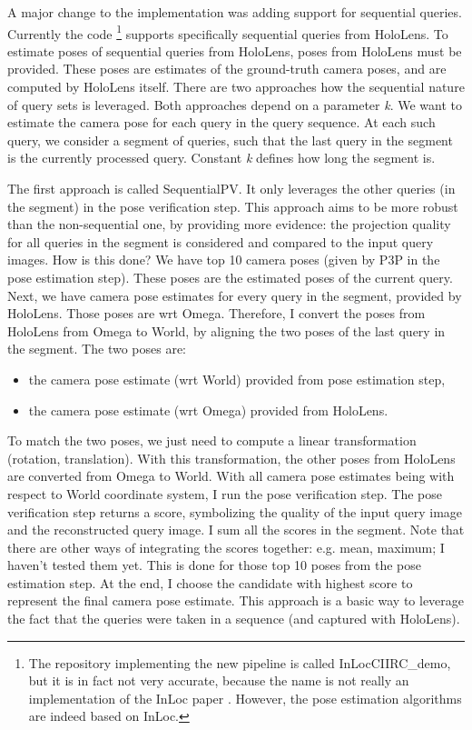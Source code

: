 \documentclass[twoside]{ctuthesis}
\theoremstyle{plain}
\theoremstyle{definition}
\theoremstyle{note}
\newcommand{\topPE}{10} %
\begin{document}
A major change to the implementation was adding support for sequential queries. Currently the code \footnote{The repository implementing the new pipeline is called InLocCIIRC\_demo, but it is in fact not very accurate, because the name is not really an implementation of the InLoc paper \cite{taira2018inloc}. However, the pose estimation algorithms are indeed based on InLoc.} supports specifically sequential queries from HoloLens. To estimate poses of sequential queries from HoloLens, poses from HoloLens must be provided. These poses are estimates of the ground-truth camera poses, and are computed by HoloLens itself. There are two approaches how the sequential nature of query sets is leveraged. Both approaches depend on a parameter \emph{k}. We want to estimate the camera pose for each query in the query sequence. At each such query, we consider a segment of queries, such that the last query in the segment is the currently processed query. Constant \emph{k} defines how long the segment is.

The first approach is called SequentialPV. It only leverages the other queries (in the segment) in the pose verification step. This approach aims to be more robust than the non-sequential one, by providing more evidence: the projection quality for all queries in the segment is considered and compared to the input query images. How is this done? We have top \topPE{} camera poses (given by P3P in the pose estimation step). These poses are the estimated poses of the current query. Next, we have camera pose estimates for every query in the segment, provided by HoloLens. Those poses are wrt Omega. Therefore, I convert the poses from HoloLens from Omega to World, by aligning the two poses of the last query in the segment. The two poses are:

\begin{itemize}
	\item the camera pose estimate (wrt World) provided from pose estimation step,
	\item the camera pose estimate (wrt Omega) provided from HoloLens.
\end{itemize}

To match the two poses, we just need to compute a linear transformation (rotation, translation). With this transformation, the other poses from HoloLens are converted from Omega to World. With all camera pose estimates being with respect to World coordinate system, I run the pose verification step. The pose verification step returns a score, symbolizing the quality of the input query image and the reconstructed query image. I sum all the scores in the segment. Note that there are other ways of integrating the scores together: e.g. mean, maximum; I haven't tested them yet. This is done for those top \topPE{} poses from the pose estimation step. At the end, I choose the candidate with highest score to represent the final camera pose estimate. This approach is a basic way to leverage the fact that the queries were taken in a sequence (and captured with HoloLens).
\end{document}
